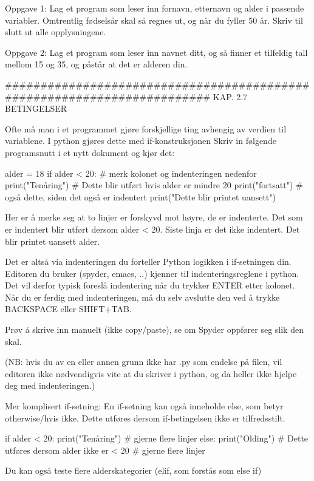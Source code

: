 \documentclass[a4paper,11pt,utf8]{book}
\begin{document}
Oppgave 1:
Lag et program som leser inn fornavn, etternavn og alder i passende variabler.
Omtrentlig fødselsår skal så regnes ut, og når du fyller 50 år.
Skriv til slutt ut alle opplysningene. 

Oppgave 2:
Lag et program som leser inn navnet ditt, og så finner et tilfeldig tall
mellom 15 og 35, og påstår at det er alderen din.




######################################################################## 
KAP. 2.7  BETINGELSER 

Ofte må man i et programmet gjøre forskjellige ting avhengig av verdien til variablene. 
I python gjøres dette med if-konstruksjonen 
Skriv in følgende programsnutt i et nytt dokument og kjør det: 

alder = 18
if alder < 20:            # merk kolonet og indenteringen nedenfor
   print("Tenåring")      # Dette blir utført hvis alder er mindre 20
   print("fortsatt")      # også dette, siden det også er indentert
print("Dette blir printet uansett")

Her er å merke seg at to linjer er forskyvd mot høyre, de er indenterte.
Det som er indentert blir utført dersom alder < 20. 
Siste linja er det ikke indentert. Det blir printet uansett alder.

Det er altså via indenteringen du forteller Python logikken i if-setningen din.
Editoren du bruker (spyder, emacs, ..) kjenner til indenteringsreglene i python.
Det vil derfor typisk foreslå indentering når du trykker ENTER etter kolonet.
Når du er ferdig med indenteringen, må du selv avslutte den ved å trykke
BACKSPACE eller SHIFT+TAB. 

Prøv å skrive inn manuelt (ikke copy/paste), se om Spyder oppfører seg slik den skal. 

(NB: hvis du av en eller annen grunn ikke har .py som endelse på filen,
vil editoren ikke nødvendigvis vite at du skriver i python,
og da heller ikke hjelpe deg med indenteringen.) 


Mer komplisert if-setning: 
En if-setning kan også inneholde else, som betyr otherwise/hvis ikke.
Dette utføres dersom if-betingelsen ikke er tilfredsstilt. 

if alder < 20: 
   print("Tenåring")
   # gjerne flere linjer
else: 
   print("Olding")     # Dette utføres dersom alder ikke er < 20
   # gjerne flere linjer

Du kan også teste flere alderskategorier (elif, som forstås som else if) 
\end{document}
